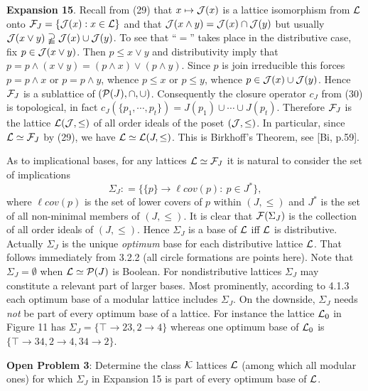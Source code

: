 \documentclass[11pt]{article}
\newcommand{\ra}{\rightarrow}
\begin{document}
{\bf Expansion 15}. Recall from (29) that $x \mapsto {\cal J}(x)$ is a lattice isomorphism from ${\cal L}$ onto ${\cal F}_J  = \{{\cal J}(x) : x \in {\cal L}\}$ and that ${\cal J}(x\wedge y) = {\cal J}(x) \cap {\cal J}(y)$ but usually ${\cal J}(x \vee y) \varsupsetneqq {\cal J}(x) \cup {\cal J}(y)$. To see that ``$=$'' takes place in the distributive case, fix $p \in {\cal J}(x \vee y)$. Then $p \leq x \vee y$ and distributivity imply that $p = p\wedge (x \vee y) = (p \wedge x) \vee (p \wedge y)$. Since $p$ is join irreducible this forces $p = p \wedge x$ or $p =p \wedge y$, whence $p \leq x$ or $p \leq y$, whence $p \in {\cal J}(x) \cup {\cal J}(y)$. Hence ${\cal F}_J$ is a sublattice of $({\cal P}(J), \cap , \cup)$. Consequently the closure operator $c_J$ from (30) is topological, in fact $c_J(\{p_1, \cdots, p_t\}) = J(p_1) \cup \cdots \cup J(p_t)$. 
Therefore ${\cal F}_J$ is the lattice ${\cal L}({\cal J}, \leq)$ of all order ideals of the poset $({\cal J}, \leq)$.
In particular, since ${\cal L} \simeq {\cal F}_J$ by (29), we have ${\cal L} \simeq {\cal L}(J, \leq)$. This is Birkhoff's Theorem, see [Bi, p.59]. 

As to implicational bases, for any lattices ${\cal L} \simeq {\cal F}_J$ it is natural to consider the set  
of implications
$$\Sigma_J : = \{\{p\} \ra \ell cov(p): \ p \in J^\ast \},$$
where $\ell cov(p)$ is the set of lower covers of $p$ within $(J, \leq)$ and $J^\ast$ is the set of all non-minimal members of $(J, \leq)$. It is clear that ${\cal F}(\Sigma_J)$ is the collection of all order ideals of $(J, \leq)$. Hence $\Sigma_J$ is a base of ${\cal L}$ iff ${\cal L}$ is distributive.  Actually $\Sigma_J$ is the unique {\it optimum} base for each distributive lattice ${\cal L}$. That follows immediately from 3.2.2 (all circle formations are points here). Note that $\Sigma_J = \emptyset$ when ${\cal L} \simeq {\cal P}(J)$ is Boolean. For nondistributive lattices $\Sigma_J$ may constitute a relevant part of larger bases. Most prominently, according to 4.1.3 each optimum base of a modular lattice includes $\Sigma_J$.  On the downside, $\Sigma_J$ needs {\it not} be part of every optimum base of a lattice. For instance the lattice ${\cal L}_0$ in Figure 11 has $\Sigma_J = \{\top \ra 23, 2 \ra 4\}$ whereas one optimum base of ${\cal L}_0$ is $\{\top \ra 34, 2 \ra 4, 34 \ra 2\}$.

{\bf Open Problem 3}: Determine the class ${\cal K}$ lattices ${\cal L}$ (among which all modular ones) for which $\Sigma_J$ in Expansion 15 is part of every optimum base of ${\cal L}$.
\end{document}
